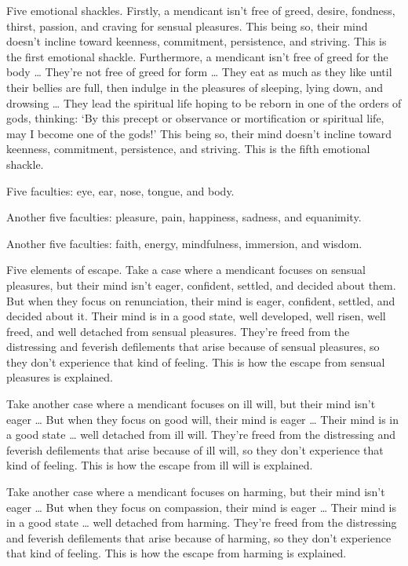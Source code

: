 \documentclass[12pt,openany]{book}%
\begin{document}
Five emotional shackles. Firstly, a mendicant isn’t free of greed, desire, fondness, thirst, passion, and craving for sensual pleasures. This being so, their mind doesn’t incline toward keenness, commitment, persistence, and striving. This is the first emotional shackle. Furthermore, a mendicant isn’t free of greed for the body … They’re not free of greed for form … They eat as much as they like until their bellies are full, then indulge in the pleasures of sleeping, lying down, and drowsing … They lead the spiritual life hoping to be reborn in one of the orders of gods, thinking: ‘By this precept or observance or mortification or spiritual life, may I become one of the gods!’ This being so, their mind doesn’t incline toward keenness, commitment, persistence, and striving. This is the fifth emotional shackle. 

Five faculties: eye, ear, nose, tongue, and body. 

Another five faculties: pleasure, pain, happiness, sadness, and equanimity. 

Another five faculties: faith, energy, mindfulness, immersion, and wisdom. 

Five elements of escape. Take a case where a mendicant focuses on sensual pleasures, but their mind isn’t eager, confident, settled, and decided about them. But when they focus on renunciation, their mind is eager, confident, settled, and decided about it. Their mind is in a good state, well developed, well risen, well freed, and well detached from sensual pleasures. They’re freed from the distressing and feverish defilements that arise because of sensual pleasures, so they don’t experience that kind of feeling. This is how the escape from sensual pleasures is explained. 

Take another case where a mendicant focuses on ill will, but their mind isn’t eager … But when they focus on good will, their mind is eager … Their mind is in a good state … well detached from ill will. They’re freed from the distressing and feverish defilements that arise because of ill will, so they don’t experience that kind of feeling. This is how the escape from ill will is explained. 

Take another case where a mendicant focuses on harming, but their mind isn’t eager … But when they focus on compassion, their mind is eager … Their mind is in a good state … well detached from harming. They’re freed from the distressing and feverish defilements that arise because of harming, so they don’t experience that kind of feeling. This is how the escape from harming is explained. 
\end{document}
